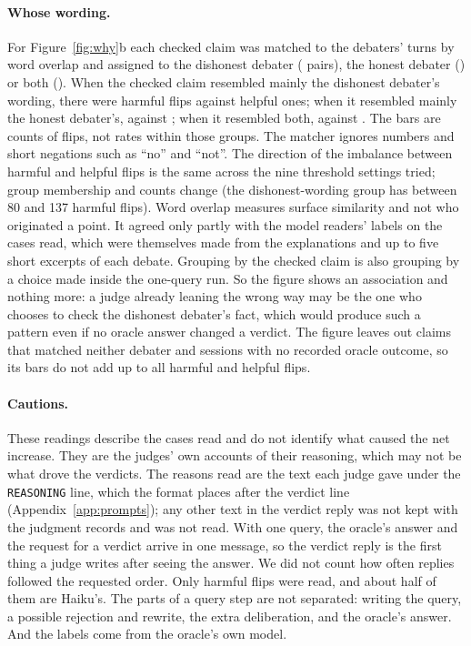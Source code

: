 \paragraph{Whose wording.} For Figure~\ref{fig:why}b each checked claim was matched to the debaters' turns by word
overlap and assigned to the dishonest debater (\pairsDis{} pairs), the honest debater (\pairsHon) or both (\pairsBoth).
When the checked claim resembled mainly the dishonest debater's wording, there were \harmDis{} harmful flips against
\helpDis{} helpful ones; when it resembled mainly the honest debater's, \harmHon{} against \helpHon; when it
resembled both, \harmBoth{} against \helpBoth. The bars are counts of flips, not rates within those groups. The matcher ignores numbers and short negations such as
``no'' and ``not''. The direction of the imbalance between harmful and helpful flips is the same across the nine
threshold settings tried; group membership and counts change (the dishonest-wording group has between 80 and 137
harmful flips). Word overlap measures surface similarity and not who originated a point. It agreed only partly with
the model readers' labels on the cases read, which were themselves made from the explanations and up to five short
excerpts of each debate. Grouping by the checked claim is also grouping by a choice made inside the one-query run.
So the figure shows an association and nothing more: a judge already leaning the wrong way may be the one who
chooses to check the dishonest debater's fact, which would produce such a pattern even if no oracle answer changed a
verdict. The figure leaves out claims that matched neither debater and sessions with no recorded oracle outcome, so
its bars do not add up to all \nHarm{} harmful and \nHelp{} helpful flips.

\paragraph{Cautions.} These readings describe the cases read and do not identify what caused the net increase. They
are the judges' own accounts of their reasoning, which may not be what drove the verdicts. The reasons read are the
text each judge gave under the \texttt{REASONING} line, which the format places after the verdict line
(Appendix~\ref{app:prompts}); any other text in the verdict reply was not kept with the judgment records and was not
read. With one query, the oracle's answer and the request for a verdict arrive in one message, so the verdict reply
is the first thing a judge writes after seeing the answer. We did not count how often replies followed the requested
order. Only harmful flips were read, and about half of them are Haiku's. The parts of a query step are not separated: writing the query, a possible
rejection and rewrite, the extra deliberation, and the oracle's answer. And the labels come from the oracle's own
model.

